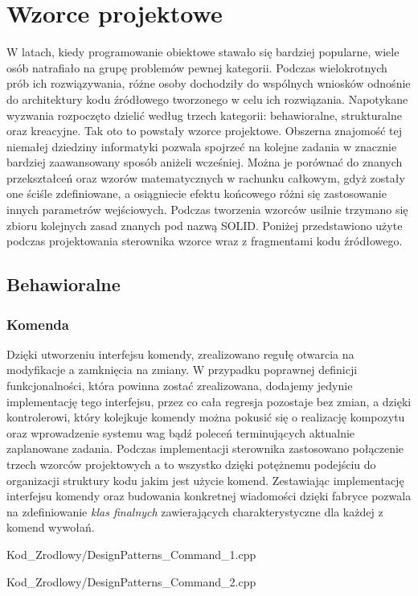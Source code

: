 \chapter{Wzorce projektowe}
W latach, kiedy programowanie obiektowe stawało się bardziej popularne, wiele osób natrafiało na grupę problemów pewnej kategorii.
Podczas wielokrotnych prób ich rozwiązywania, różne osoby dochodziły do wspólnych wniosków odnośnie do architektury kodu źródłowego tworzonego w celu ich rozwiązania.
Napotykane wyzwania rozpoczęto dzielić według trzech kategorii: behawioralne, strukturalne oraz kreacyjne. Tak oto to powstały wzorce projektowe.
Obszerna znajomość tej niemałej dziedziny informatyki pozwala spojrzeć na kolejne zadania w znacznie bardziej zaawansowany sposób aniżeli wcześniej.
Można je porównać do znanych przekształceń oraz wzorów matematycznych w rachunku całkowym, gdyż zostały one ściśle zdefiniowane, a osiągniecie efektu końcowego różni się
zastosowanie innych parametrów wejściowych. Podczas tworzenia wzorców usilnie trzymano się zbioru kolejnych zasad znanych pod nazwą SOLID. \newline
Poniżej przedstawiono użyte podczas projektowania sterownika wzorce wraz z fragmentami kodu źródłowego.
\section{Behawioralne}
    \subsection{Komenda}
        Dzięki utworzeniu interfejsu komendy, zrealizowano regułę otwarcia na modyfikacje a zamknięcia na zmiany.
        W przypadku poprawnej definicji funkcjonalności, która powinna zostać zrealizowana, dodajemy jedynie implementację tego interfejsu,
        przez co cała regresja pozostaje bez zmian, a dzięki kontrolerowi, który kolejkuje komendy można pokusić się o realizację kompozytu oraz
        wprowadzenie systemu wag bądź poleceń terminujących aktualnie zaplanowane zadania.
        Podczas implementacji sterownika zastosowano połączenie trzech wzorców projektowych a to wszystko dzięki potężnemu podejściu do organizacji
        struktury kodu jakim jest użycie komend. Zestawiając implementację interfejsu komendy oraz budowania konkretnej wiadomości dzięki fabryce
        pozwala na zdefiniowanie \textit{klas finalnych} zawierających charakterystyczne dla każdej z komend wywołań. 
        
            {Kod_Zrodlowy/DesignPatterns_Command_1.cpp}
        
            {Kod_Zrodlowy/DesignPatterns_Command_2.cpp}
    \newpage
